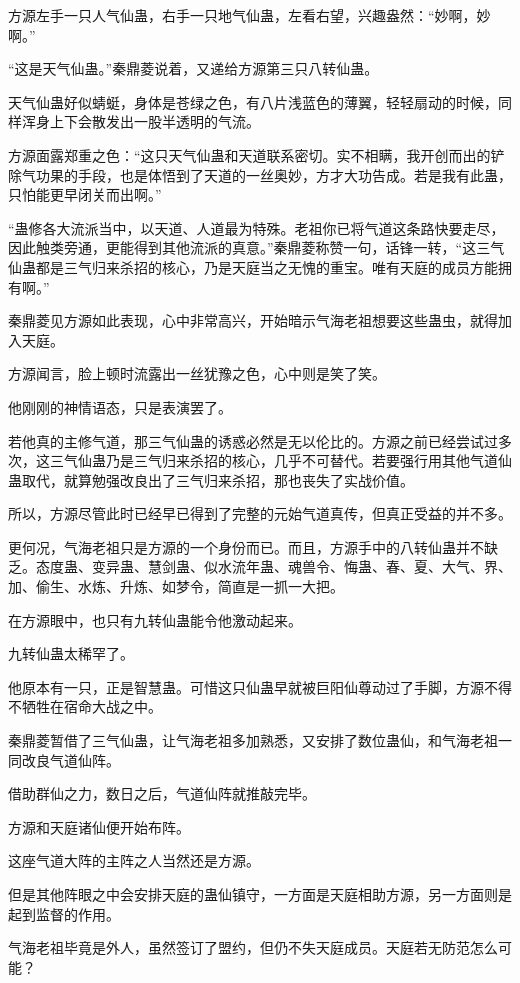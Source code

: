 \begin{this_body}
方源左手一只人气仙蛊，右手一只地气仙蛊，左看右望，兴趣盎然：“妙啊，妙啊。”

“这是天气仙蛊。”秦鼎菱说着，又递给方源第三只八转仙蛊。

天气仙蛊好似蜻蜓，身体是苍绿之色，有八片浅蓝色的薄翼，轻轻扇动的时候，同样浑身上下会散发出一股半透明的气流。

方源面露郑重之色：“这只天气仙蛊和天道联系密切。实不相瞒，我开创而出的铲除气功果的手段，也是体悟到了天道的一丝奥妙，方才大功告成。若是我有此蛊，只怕能更早闭关而出啊。”

“蛊修各大流派当中，以天道、人道最为特殊。老祖你已将气道这条路快要走尽，因此触类旁通，更能得到其他流派的真意。”秦鼎菱称赞一句，话锋一转，“这三气仙蛊都是三气归来杀招的核心，乃是天庭当之无愧的重宝。唯有天庭的成员方能拥有啊。”

秦鼎菱见方源如此表现，心中非常高兴，开始暗示气海老祖想要这些蛊虫，就得加入天庭。

方源闻言，脸上顿时流露出一丝犹豫之色，心中则是笑了笑。

他刚刚的神情语态，只是表演罢了。

若他真的主修气道，那三气仙蛊的诱惑必然是无以伦比的。方源之前已经尝试过多次，这三气仙蛊乃是三气归来杀招的核心，几乎不可替代。若要强行用其他气道仙蛊取代，就算勉强改良出了三气归来杀招，那也丧失了实战价值。

所以，方源尽管此时已经早已得到了完整的元始气道真传，但真正受益的并不多。

更何况，气海老祖只是方源的一个身份而已。而且，方源手中的八转仙蛊并不缺乏。态度蛊、变异蛊、慧剑蛊、似水流年蛊、魂兽令、悔蛊、春、夏、大气、界、加、偷生、水炼、升炼、如梦令，简直是一抓一大把。

在方源眼中，也只有九转仙蛊能令他激动起来。

九转仙蛊太稀罕了。

他原本有一只，正是智慧蛊。可惜这只仙蛊早就被巨阳仙尊动过了手脚，方源不得不牺牲在宿命大战之中。

秦鼎菱暂借了三气仙蛊，让气海老祖多加熟悉，又安排了数位蛊仙，和气海老祖一同改良气道仙阵。

借助群仙之力，数日之后，气道仙阵就推敲完毕。

方源和天庭诸仙便开始布阵。

这座气道大阵的主阵之人当然还是方源。

但是其他阵眼之中会安排天庭的蛊仙镇守，一方面是天庭相助方源，另一方面则是起到监督的作用。

气海老祖毕竟是外人，虽然签订了盟约，但仍不失天庭成员。天庭若无防范怎么可能？


\end{this_body}
